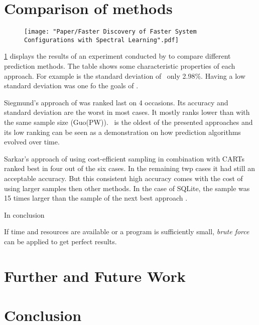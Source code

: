 \section{Comparison of methods}
\begin{figure}[t]
	\centering
	\label{tab:ConclusionPerformanceOverview}
	\vspace{-.5\baselineskip}
	\texttt{[image: "Paper/Faster Discovery of Faster System Configurations with Spectral Learning".pdf]}
	\vspace{-1\baselineskip}	
\end{figure}
\cref{tab:ConclusionPerformanceOverview} displays the results of an experiment conducted by \citet{FasterDiscoveryofFasterSystemConfigurationsSiegmund2017} to compare different prediction methods. The table shows some characteristic properties of each approach. For example is the standard deviation of \WHAT~only 2.98\%. Having a low standard deviation was one fo the goals of \What. 

Siegmund's approach of \AFID was ranked last on 4 occasions. Its accuracy and standard deviation are the worst in most cases. It mostly ranks lower than \VAPP with the same sample size (Guo(PW)). \WHAT~is the oldest of the presented approaches and its low ranking can be seen as a demonstration on how prediction algorithms evolved over time.

Sarkar's approach of using cost-efficient sampling in combination with CARTs ranked best in four out of the six cases. In the remaining twp cases it had still an acceptable accuracy. But this consistent high accuracy comes with the cost of using larger samples then other methods. In the case of SQLite, the sample was 15 times larger than the sample of the next best approach \WHAT. 


In conclusion 


If time and resources are available or a program is sufficiently small, \textit{brute force} can be applied to get perfect results.\textsl{} 




\FloatBarrier
\section{Further and Future Work}



\section{Conclusion}